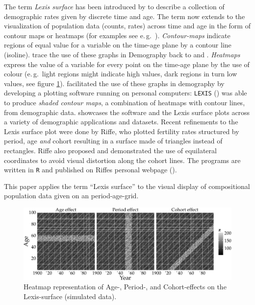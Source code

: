 \documentclass[a4paper]{scrartcl}
\begin{document}
The term \emph{Lexis surface} has been introduced by \textcite{Arthur1984} to describe a collection of demographic rates given by discrete time and age. The term now extends to the visualization of population data (counts, rates) across time and age in the form of contour maps or heatmaps (for examples see e.\,g.~\cite{Rau2008, Scherbov2002}). \emph{Contour-maps} indicate regions of equal value for a variable on the time-age plane by a contour line (isoline). \textcite{Vaupel1987} trace the use of these graphs in Demography back to \textcite{Kermack1934} and \textcite{Delaporte1941}. \emph{Heatmaps} express the value of a variable for every point on the time-age plane by the use of colour (e.\,g.~light regions might indicate high values, dark regions in turn low values, see figure \ref{fig:lexis_fx}). \citeauthor{Gambill1985} facilitated the use of these graphs in demography by developing a plotting software running on personal computers: \texttt{LEXIS} (\cite{Gambill1985}) was able to produce \emph{shaded contour maps}, a combination of heatmaps with contour lines, from demographic data.  showcases the software and the Lexis surface plots across a variety of demographic applications and datasets. Recent refinements to the Lexis surface plot were done by Riffe, who plotted fertility rates structured by period, age \emph{and} cohort resulting in a surface made of triangles instead of rectangles. Riffe also proposed and demonstrated the use of equilateral coordinates to avoid visual distortion along the cohort lines. The programs are written in \texttt{R} and published on Riffes personal webpage (\cite{Riffe2014}).

This paper applies the term \enquote{Lexis surface} to the visual display of compositional population data given on an period-age-grid.

\begin{figure}[htb!]
  \centering
  \includegraphics[width = \linewidth]{../fig/plot-lexis_fx.pdf}
  \caption{Heatmap representation of Age-, Period-, and Cohort-effects on the Lexis-surface (simulated data).}
  \label{fig:lexis_fx}
\end{figure}
\end{document}

